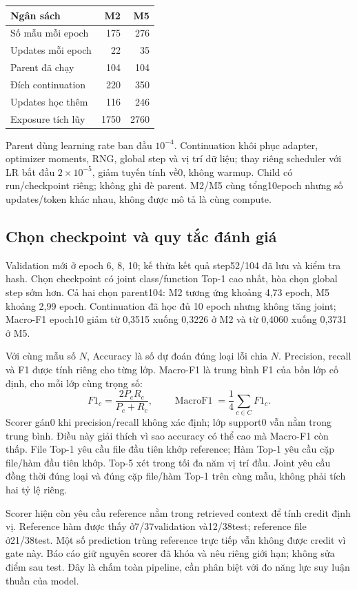 \documentclass[12pt,a4paper]{article}
\begin{document}
\begin{center}\small
\begin{tabular}{lrr}\toprule
Ngân sách & M2 & M5\\\midrule
Số mẫu mỗi epoch &175&276\\
Updates mỗi epoch &22&35\\
Parent đã chạy &104&104\\
Đích continuation &220&350\\
Updates học thêm &116&246\\
Exposure tích lũy &1750&2760\\\bottomrule
\end{tabular}\end{center}

Parent dùng learning rate ban đầu \(10^{-4}\). Continuation khôi phục adapter, optimizer moments, RNG, global step và vị trí dữ liệu; thay riêng scheduler với LR bắt đầu \(2\times10^{-5}\), giảm tuyến tính về0, không warmup. Child có run/checkpoint riêng; không ghi đè parent. M2/M5 cùng tổng10epoch nhưng số updates/token khác nhau, không được mô tả là cùng compute.

\nextpage
\subsection{Chọn checkpoint và quy tắc đánh giá}
Validation mới ở epoch 6, 8, 10; kế thừa kết quả step52/104 đã lưu và kiểm tra hash. Chọn checkpoint có joint class/function Top-1 cao nhất, hòa chọn global step sớm hơn. Cả hai chọn parent104: M2 tương ứng khoảng 4,73 epoch, M5 khoảng 2,99 epoch. Continuation đã học đủ 10 epoch nhưng không tăng joint; Macro-F1 epoch10 giảm từ 0,3515 xuống 0,3226 ở M2 và từ 0,4060 xuống 0,3731 ở M5.

Với cùng mẫu số \(N\), Accuracy là số dự đoán đúng loại lỗi chia \(N\). Precision, recall và F1 được tính riêng cho từng lớp. Macro-F1 là trung bình F1 của bốn lớp cố định, cho mỗi lớp cùng trọng số:
\[
F1_c=\frac{2P_cR_c}{P_c+R_c},\qquad
\operatorname{MacroF1}=\frac14\sum_{c\in C}F1_c.
\]
Scorer gán0 khi precision/recall không xác định; lớp support0 vẫn nằm trong trung bình. Điều này giải thích vì sao accuracy có thể cao mà Macro-F1 còn thấp. File Top-1 yêu cầu file đầu tiên khớp reference; Hàm Top-1 yêu cầu cặp file/hàm đầu tiên khớp. Top-5 xét trong tối đa năm vị trí đầu. Joint yêu cầu đồng thời đúng loại và đúng cặp file/hàm Top-1 trên cùng mẫu, không phải tích hai tỷ lệ riêng.

Scorer hiện còn yêu cầu reference nằm trong retrieved context để tính credit định vị. Reference hàm được thấy ở7/37validation và12/38test; reference file ở21/38test. Một số prediction trùng reference trực tiếp vẫn không được credit vì gate này. Báo cáo giữ nguyên scorer đã khóa và nêu riêng giới hạn; không sửa điểm sau test. Đây là chấm toàn pipeline, cần phân biệt với đo năng lực suy luận thuần của model.
\end{document}
